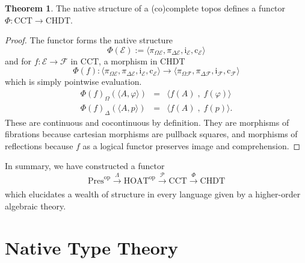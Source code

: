 \documentclass[conference]{IEEEtran}
\theoremstyle{definition}
\newtheorem{theorem}{Theorem}
\newcommand{\msc}[1]{\mathscr{#1}}
\newcommand{\mrm}[1]{\mathrm{#1}}
\newcommand{\xr}[2]{\xrightarrow[#2]{#1}}
\newcommand{\op}{\mrm{op}}
\newcommand{\HOAT}{\mrm{HOAT}}
\newcommand{\pow}{\msc{P}}
\begin{document}
\begin{theorem}
    The native structure of a (co)complete topos defines a functor $\Phi:\mrm{CCT}\to \mrm{CHDT}$.
\end{theorem}
\begin{proof}
    The functor forms the native structure
    \[\Phi(\msc{E}) := \langle \pi_{\Omega\msc{E}}, \pi_{\Delta\msc{E}}, \mrm{i}_\msc{E}, \mrm{c}_\msc{E}\rangle\]
    and for $f:\msc{E}\to \msc{F}$ in $\mrm{CCT}$, a morphism in CHDT
    \[\Phi(f): \langle \pi_{\Omega\msc{E}}, \pi_{\Delta\msc{E}}, \mrm{i}_{\msc{E}}, \mrm{c}_{\msc{E}}\rangle\to \langle \pi_{\Omega\msc{F}}, \pi_{\Delta\msc{F}}, \mrm{i}_{\msc{F}}, \mrm{c}_{\msc{F}}\rangle  \]
    which is simply pointwise evaluation.
    \[\begin{array}{lcl}
        \Phi(f)_\Omega(\langle A,\varphi\rangle) & = & \langle f(A) \;,\; f(\varphi)\rangle\\
        \Phi(f)_\Delta(\langle A,p\rangle) & = & \langle f(A) \;,\; f(p)\rangle.
    \end{array}\]
    These are continuous and cocontinuous by definition. They are morphisms of fibrations because cartesian morphisms are pullback squares, and morphisms of reflections because $f$ as a logical functor preserves image and comprehension.
\end{proof}

In summary, we have constructed a functor
\[\mrm{Pres}^\op \xr{\Lambda}{} \HOAT^\op\xr{\pow}{} \mrm{CCT} \xr{\Phi}{} \mrm{CHDT}\]
which elucidates a wealth of structure in every language given by a higher-order algebraic theory.



\section{Native Type Theory}
\label{sec:typeth}
\end{document}
